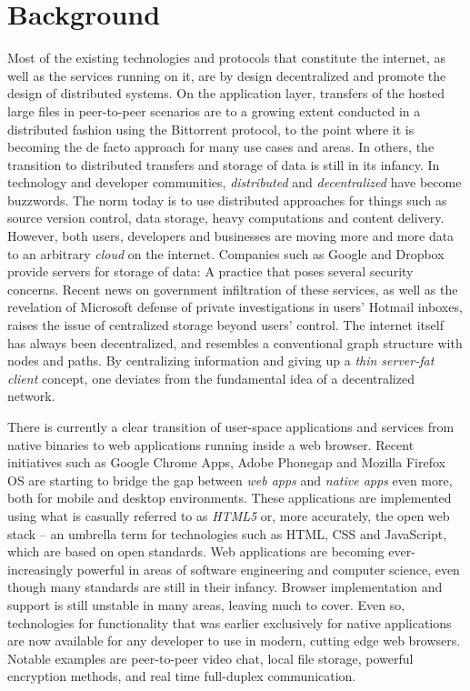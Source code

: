 \section{Background}
Most of the existing technologies and protocols that constitute the internet, as well as the services running on it, are by design decentralized and promote the design of distributed systems. On the application layer, transfers of the hosted large files in peer-to-peer scenarios are to a growing extent conducted in a distributed fashion using the Bittorrent protocol, to the point where it is becoming the de facto approach for many use cases and areas. In others, the transition to distributed transfers and storage of data is still in its infancy. In technology and developer communities, \emph{distributed} and \emph{decentralized} have become buzzwords. The norm today is to use distributed approaches for things such as source version control, data storage, heavy computations and content delivery.
However, both users, developers and businesses are moving more and more data to an arbitrary \emph{cloud} on the internet. Companies such as Google and Dropbox provide servers for storage of data: A practice that poses several security concerns. Recent news on government infiltration of these services, as well as the revelation of Microsoft  defense of private investigations in users' Hotmail inboxes, raises the issue of centralized storage beyond users' control. The internet itself has always been decentralized, and resembles a conventional graph structure with nodes and paths. By centralizing information and giving up a \emph{thin server-fat client} concept, one deviates from the fundamental idea of a decentralized network.

There is currently a clear transition of user-space applications and services from native binaries to web applications running inside a web browser. Recent initiatives such as Google Chrome Apps, Adobe Phonegap and Mozilla Firefox OS are starting to bridge the gap between \emph{web apps} and \emph{native apps} even more, both for mobile and desktop environments. These applications are implemented using what is casually referred to as \emph{HTML5} or, more accurately, the open web stack – an umbrella term for technologies such as HTML, CSS and JavaScript, which are based on open standards. Web applications are becoming ever-increasingly powerful in areas of software engineering and computer science, even though many standards are still in their infancy. Browser implementation and support is still unstable in many areas, leaving much to cover. Even so, technologies for functionality that was earlier exclusively for native applications are now available for any developer to use in modern, cutting edge web browsers. Notable examples are peer-to-peer video chat, local file storage, powerful encryption methods, and real time full-duplex communication.

